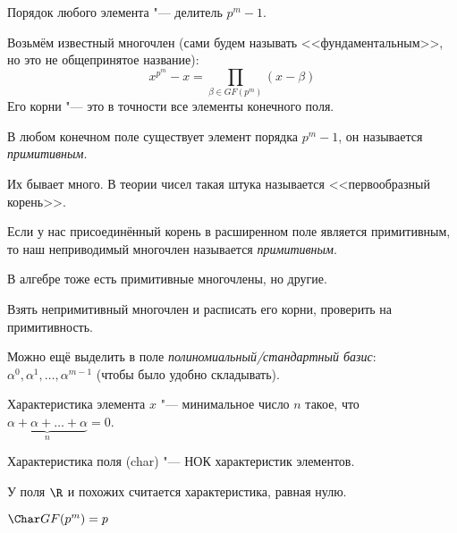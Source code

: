 \begin{theorem}
	Порядок любого элемента "--- делитель $p^m-1$.
\end{theorem}

\begin{theorem}
	Возьмём известный многочлен (сами будем называть <<фундаментальным>>,
	но это не общепринятое название):
	\[
		x^{p^m} - x = \prod_{\beta \in GF(p^m)} (x - \beta)
	\]
	Его корни "--- это в точности все элементы конечного поля.
\end{theorem}

\begin{theorem}
	В любом конечном поле существует элемент порядка $p^m-1$, он называется \textit{примитивным}.
\end{theorem}
\begin{Rem}
	Их бывает много.
	В теории чисел такая штука называется <<первообразный корень>>.
\end{Rem}

\begin{Def}
	Если у нас присоединённый корень в расширенном поле является примитивным,
	то наш неприводимый многочлен называется \textit{примитивным}.
\end{Def}
\begin{Rem}
	В алгебре тоже есть примитивные многочлены, но другие.
\end{Rem}

\begin{Exercise}
	Взять непримитивный многочлен и расписать его корни, проверить
	на примитивность.
\end{Exercise}

\begin{Rem}
	Можно ещё выделить в поле \textit{полиномиальный/стандартный базис}:
	$\alpha^0, \alpha^1, \dots, \alpha^{m-1}$
	(чтобы было удобно складывать).
\end{Rem}

\begin{Def}
	Характеристика элемента $x$ "--- минимальное число
	$n$ такое, что $\underbrace{\alpha+\alpha+\dots+\alpha}_{n}=0$.
\end{Def}
\begin{theorem}
	Характеристика поля (char) "--- НОК характеристик элементов.
\end{theorem}
\begin{Rem}
	У поля $\R$ и похожих считается характеристика, равная нулю.
\end{Rem}
\begin{lemma}
	$\Char GF(p^m) = p$
\end{lemma}

